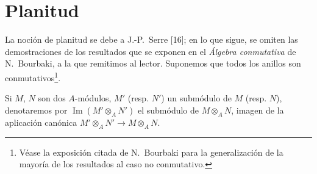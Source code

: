 \section{Planitud}
\label{section:0.6-fr}

\begin{env}[6.0]
\label{0.6.0.0-fr}
La noción de planitud se debe a J.-P.~Serre [16]; en lo que sigue, se omiten
las demostraciones de los resultados que se exponen en el \emph{Álgebra
conmutativa} de N.~Bourbaki, a la que remitimos al lector. Suponemos que
todos los anillos son conmutativos\footnote{Véase la exposición citada de
N.~Bourbaki para la generalización de la mayoría de los resultados al caso no
conmutativo.}.


Si $M$, $N$ son dos $A$-módulos, $M'$ (resp. $N'$) un submódulo de $M$
(resp. $N$), denotaremos por $\operatorname{Im}(M'\otimes_A N')$ el submódulo
de $M\otimes_A N$, imagen de la aplicación canónica
$M'\otimes_A N'\to M\otimes_A N$.
\end{env}

